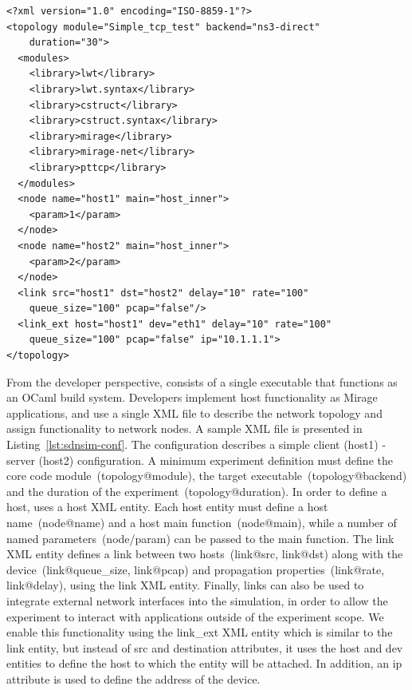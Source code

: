 \lstset{language=XML,
numberstyle=\footnotesize,
basicstyle=\ttfamily\footnotesize,
captionpos=b,
}
\begin{lstlisting}[caption={A sample \sdnsim configuration file interconnecting
  a server and a client host},label={lst:sdnsim-conf}]
<?xml version="1.0" encoding="ISO-8859-1"?>
<topology module="Simple_tcp_test" backend="ns3-direct" 
    duration="30">
  <modules>
    <library>lwt</library>
    <library>lwt.syntax</library>
    <library>cstruct</library>
    <library>cstruct.syntax</library>
    <library>mirage</library>
    <library>mirage-net</library>
    <library>pttcp</library>
  </modules>
  <node name="host1" main="host_inner"> 
    <param>1</param>
  </node>
  <node name="host2" main="host_inner"> 
    <param>2</param>
  </node>
  <link src="host1" dst="host2" delay="10" rate="100" 
    queue_size="100" pcap="false"/>
  <link_ext host="host1" dev="eth1" delay="10" rate="100" 
    queue_size="100" pcap="false" ip="10.1.1.1">
</topology>
\end{lstlisting}

From the developer perspective, \sdnsim consists of a single executable that
functions as an OCaml build system. Developers implement host functionality as
Mirage applications, and use a single XML file to describe the network topology
and assign functionality to network nodes.  A sample XML file is presented in
Listing~\ref{lst:sdnsim-conf}. The configuration describes a simple client
(host1) - server (host2) configuration.  A minimum experiment definition must
define the core code module~(topology@module), the target
executable~(topology@backend) and the duration of the
experiment~(topology@duration). In order to define a host, \sdnsim uses a host
XML entity. Each host entity must define a host name~(node@name) and a host main
function~(node@main), while a number of named parameters~(node/param) can be
passed to the main function. The link XML entity defines a link between two
hosts~(link@src, link@dst) along with the device~(link@queue\_size, link@pcap)
and propagation properties~(link@rate, link@delay), using the link XML entity.
Finally, links can also be used to integrate external network interfaces into
the simulation, in order to allow the experiment to interact with applications
outside of the experiment scope. We enable this functionality using the
link\_ext XML entity which is similar to the link entity, but instead of src and
destination attributes, it uses the host and dev entities to define the host to
which the entity will be attached. In addition, an ip attribute is used to
define the address of the device. 

